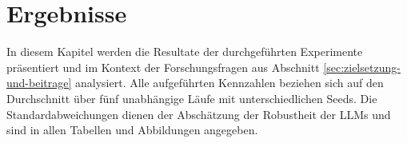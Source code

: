 \chapter{Ergebnisse}\label{ch:ergebnisse}

In diesem Kapitel werden die Resultate der durchgeführten Experimente präsentiert und im Kontext der Forschungsfragen aus Abschnitt \ref{sec:zielsetzung-und-beitrage} analysiert. Alle aufgeführten Kennzahlen beziehen sich auf den Durchschnitt über fünf unabhängige Läufe mit unterschiedlichen Seeds. Die Standardabweichungen dienen der Abschätzung der Robustheit der \acp{LLM} und sind in allen Tabellen und Abbildungen angegeben.






